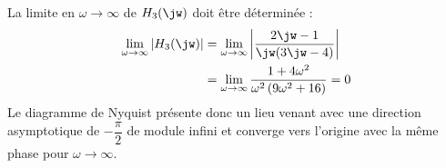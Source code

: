 La limite en $\omega\rightarrow\infty$ de $H_3(\jw)$ doit être déterminée :
\begin{align*}
    \lim\limits_{\omega\rightarrow\infty}|H_3(\jw)|&= 
    \lim\limits_{\omega\rightarrow\infty}
    \left|\dfrac{2\jw-1}{\jw(3\jw-4)}\right|\\
    &=\lim\limits_{\omega\rightarrow\infty}
    \dfrac{1+4\omega^2}{\omega^2\left(9\omega^2+16\right)}=0
\end{align*}
Le diagramme de Nyquist présente donc un lieu venant avec une 
direction asymptotique de $-\dfrac{\pi}{2}$ de module infini et converge vers 
l'origine avec la même phase pour $\omega\rightarrow\infty$.

